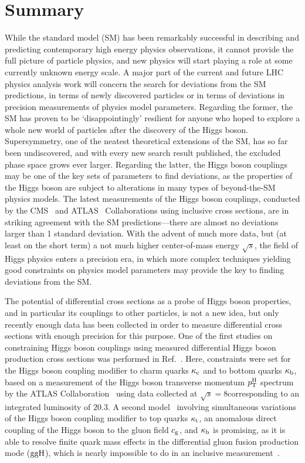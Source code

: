 \section{Summary}

While the standard model (SM) has been remarkably successful in describing and predicting contemporary high energy physics observations, it cannot provide the full picture of particle physics, and new physics will start playing a role at some currently unknown energy scale.
% 
A major part of the current and future LHC physics analysis work will concern the search for deviations from the SM predictions, in terms of newly discovered particles or in terms of deviations in precision measurements of physics model parameters.
% 
Regarding the former, the SM has proven to be `disappointingly' resilient for anyone who hoped to explore a whole new world of particles after the discovery of the Higgs boson.
% 
Supersymmetry, one of the neatest theoretical extensions of the SM, has so far been undiscovered, and with every new search result published, the excluded phase space grows ever larger.
% 
Regarding the latter, the Higgs boson couplings may be one of the key sets of parameters to find deviations, as the properties of the Higgs boson are subject to alterations in many types of beyond-the-SM physics models.
% 
The latest measurements of the Higgs boson couplings, conducted by the CMS~\cite{Sirunyan:2018koj} and ATLAS~\cite{ATLAS-CONF-2019-005} Collaborations using inclusive cross sections, are in striking agreement with the SM predictions---there are almost no deviations larger than 1 standard deviation.
% 
With the advent of much more data, but (at least on the short term) a not much higher center-of-mass energy $\sqrt{s}$, the field of Higgs physics enters a precision era, in which more complex techniques yielding good constraints on physics model parameters may provide the key to finding deviations from the SM.


The potential of differential cross sections as a probe of Higgs boson properties, and in particular its couplings to other particles, is not a new idea, but only recently enough data has been collected in order to measure differential cross sections with enough precision for this purpose.
% 
One of the first studies on constraining Higgs boson couplings using measured differential Higgs boson production cross sections was performed in Ref.~\cite{Bishara:2016jga}.
% 
Here, constraints were set for the Higgs boson coupling modifier to charm quarks $\kappa_{\mathrm{c}}$ and to bottom quarks $\kappa_{\mathrm{b}}$, based on a measurement of the Higgs boson transverse momentum $p_\mathrm{T}^\mathrm{H}$ spectrum by the ATLAS Collaboration~\cite{Aad:2015lha} using data collected at $\sqrt{s}=8$\TeV corresponding to an integrated luminosity of $20.3$\fbinv.
% 
A second model~\cite{Grazzini:2017szg,Grazzini:2016paz} involving simultaneous variations of the Higgs boson coupling modifier to top quarks $\kappa_{\mathrm{t}}$, an anomalous direct coupling of the Higgs boson to the gluon field $c_\mathrm{g}$, and $\kappa_{\mathrm{b}}$ is promising, as it is able to resolve finite quark mass effects in the differential gluon fusion production mode ($\mathrm{g}\mathrm{g}\mathrm{H}$), which is nearly impossible to do in an inclusive measurement~\cite{Azatov:2013xha}.



